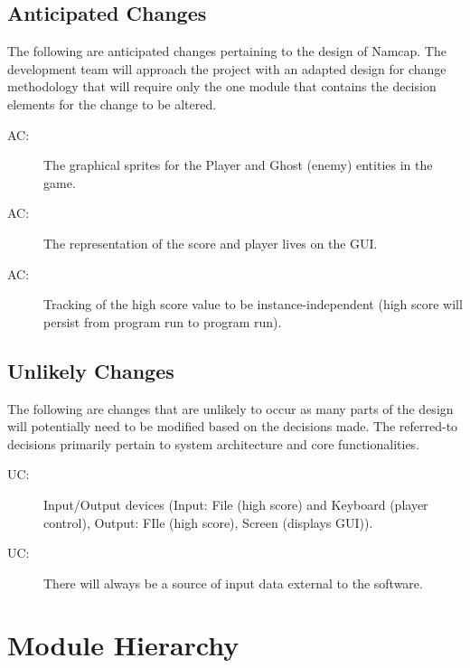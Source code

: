 \documentclass[12pt, titlepage]{article}
\newcounter{acnum}
\newcommand{\actheacnum}{AC\theacnum}
\newcounter{ucnum}
\newcommand{\uctheucnum}{UC\theucnum}
\begin{document}
\subsection{Anticipated Changes} \label{SecAchange}

The following are anticipated changes pertaining to the design of Namcap. The development team will approach the project with an adapted design for change methodology that will require only the one module that contains the decision elements for the change to be altered.

\begin{description}
\item[ \actheacnum \label{acSprites}:] The graphical sprites for the Player and Ghost (enemy) entities in the game.
\item[ \actheacnum \label{acStats}:] The representation of the score and player lives on the GUI.
\item[ \actheacnum \label{acHScore}:] Tracking of the high score value to be instance-independent (high score will persist from program run to program run).
\end{description}

\subsection{Unlikely Changes} \label{SecUchange}

The following are changes that are unlikely to occur as many parts of the design will potentially need to be modified based on the decisions made. The referred-to decisions primarily pertain to system architecture and core functionalities.

\begin{description}
\item[ \uctheucnum \label{ucIO}:] Input/Output devices (Input: File (high score) and Keyboard (player control), Output: FIle (high score), Screen (displays GUI)).
\item[ \uctheucnum \label{ucInput}:] There will always be a source of input data external to the software.
\end{description}

\section{Module Hierarchy} \label{SecMH}
\end{document}
